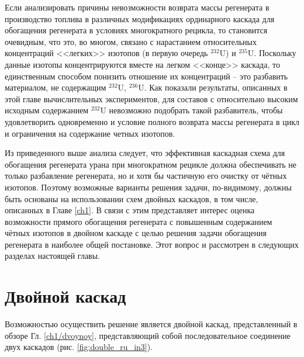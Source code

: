 Если анализировать причины невозможности возврата массы регенерата в производство топлива в различных модификациях ординарного каскада для обогащения регенерата в условиях многократного рецикла, то становится очевидным, что это, во многом, связано с нарастанием относительных концентраций <<легких>> изотопов (в первую очередь $^{232}$U) и $^{235}$U. Поскольку данные изотопы концентрируются вместе на легком <<конце>> каскада, то единственным способом понизить отношение их концентраций -- это разбавить материалом, не содержащим $^{232}$U, $^{236}$U. Как показали результаты, описанных в этой главе вычислительных экспериментов, для составов с относительно высоким исходным содержанием $^{232}$U невозможно подобрать такой разбавитель, чтобы удовлетворить одновременно и условие полного возврата массы регенерата в цикл и ограничения на содержание четных изотопов.

Из приведенного выше анализа следует, что эффективная каскадная схема для обогащения регенерата урана при многократном рецикле должна обеспечивать не только разбавление регенерата, но и хотя бы частичную его очистку от чётных изотопов. Поэтому возможные варианты решения задачи, по-видимому, должны быть основаны на использовании схем двойных каскадов, в том числе, описанных в Главе \ref{ch1}. В связи с этим представляет интерес оценка возможности прямого обогащения регенерата с повышенным содержанием чётных изотопов в двойном каскаде с целью решения задачи обогащения регенерата в наиболее общей постановке. Этот вопрос и рассмотрен в следующих разделах настоящей главы.



\section{Двойной каскад}\label{sec:ch2/dvoynoy}

Возможностью осуществить решение является двойной каскад, представленный в обзоре Гл. \ref{ch1/dvoynoy}, представляющий собой последовательное соединение двух каскадов (рис. \ref{fig:double_ru_in3}). 

